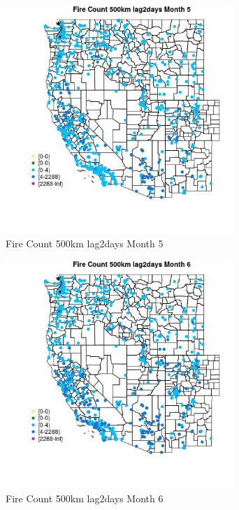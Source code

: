 \begin{figure} 
\centering  
\includegraphics[width=0.77\textwidth]{Code_Outputs/Report_ML_input_PM25_Step4_part_e_de_duplicated_aves_compiled_2019-05-21wNAs_MapObsMo5Fire_Count_500km_lag2days.jpg} 
\caption{\label{fig:Report_ML_input_PM25_Step4_part_e_de_duplicated_aves_compiled_2019-05-21wNAsMapObsMo5Fire_Count_500km_lag2days}Fire Count 500km lag2days Month 5} 
\end{figure} 
 

\clearpage 

\begin{figure} 
\centering  
\includegraphics[width=0.77\textwidth]{Code_Outputs/Report_ML_input_PM25_Step4_part_e_de_duplicated_aves_compiled_2019-05-21wNAs_MapObsMo6Fire_Count_500km_lag2days.jpg} 
\caption{\label{fig:Report_ML_input_PM25_Step4_part_e_de_duplicated_aves_compiled_2019-05-21wNAsMapObsMo6Fire_Count_500km_lag2days}Fire Count 500km lag2days Month 6} 
\end{figure} 
 

